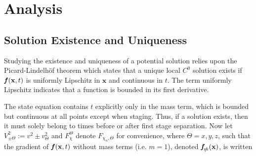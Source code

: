 \documentclass[11pt]{thesis}
\numberwithin{equation}{section}
\begin{document}
\chapter{Analysis}
\newpage
\section{Solution Existence and Uniqueness}
Studying the existence and uniqueness of a potential solution relies upon the Picard-Lindelh\"of theorem which states that a unique local $C^0$ solution exists if $\textit{\textbf{f}}\hspace{0.4ex}(\mathbf{x}, t)$ is uniformly Lipschitz in $\mathbf{x}$ and continuous in $t$. The term uniformly Lipschitz indicates that a function is bounded in its first derivative. 

The state equation contains $t$ explicitly only in the mass term, which is bounded but continuous at all points except when staging. Thus, if a solution exists, then it must solely belong to times before or after first stage separation. Now let $V_{\pm\Theta}^2 := v^2 \pm v_{\Theta}^2$ and $F_\chi^\Theta$ denote $F_{\chi_n, \Theta}$ for convenience, where $\Theta = x,y,z$, such that the gradient of $\textit{\textbf{f}}\hspace{0.4ex}(\mathbf{x},t)$ without mass terms (i.e. $m = 1$), denoted $\textit{\textbf{f}}_{\slashed{m}}(\mathbf{x})$, is written
\end{document}
